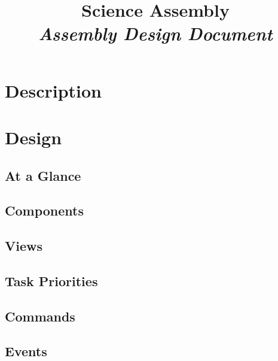 



\title{\textbf{Science Assembly} \\
\large\textit{Assembly Design Document}}
\date{}
\maketitle

\section{Description}


\section{Design}

\subsection{At a Glance}


\subsection{Components}


\subsection{Views}


\subsection{Task Priorities}


\subsection{Commands}



\subsection{Events}



